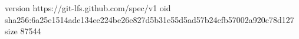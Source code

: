 version https://git-lfs.github.com/spec/v1
oid sha256:6a25e1514ade134ee224be26e827d5b31e55d5ad57b24cfb57002a920c78d127
size 87544
